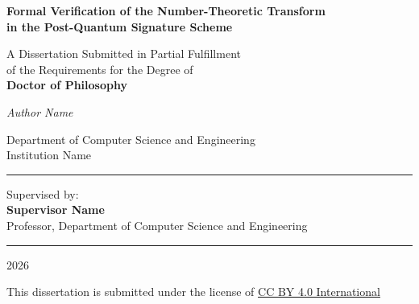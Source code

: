 
\newpage
\thispagestyle{empty}

\null\vspace{2cm}

{\centering\LARGE\bfseries
Formal Verification of the Number-Theoretic Transform\\[0.5em]
in the \haetae{} Post-Quantum Signature Scheme\par}

\vspace{1.5cm}

{\centering\large
A Dissertation Submitted in Partial Fulfillment\\
of the Requirements for the Degree of\\[0.5em]
\textbf{Doctor of Philosophy}\par}

\vspace{1.5cm}

{\centering\Large\itshape {Author Name}\par}

\vspace{0.5cm}

{\centering\large
Department of Computer Science and Engineering\\
{Institution Name}\par}

\vspace{1.5cm}

\begin{center}\rule{0.6\textwidth}{0.5pt}\end{center}

\vspace{0.5cm}

{\centering\large
Supervised by:\\[0.3em]
\textbf{{Supervisor Name}}\\
Professor, Department of Computer Science and Engineering\par}

\vspace{1.5cm}

\begin{center}\rule{0.6\textwidth}{0.5pt}\end{center}

\vspace{0.5cm}

{\centering\large 2026\par}

\vfill

{\centering\small
This dissertation is submitted under the license of
\href{https://creativecommons.org/licenses/by/4.0/}{CC BY 4.0 International}\par}

\cleardoublepage
